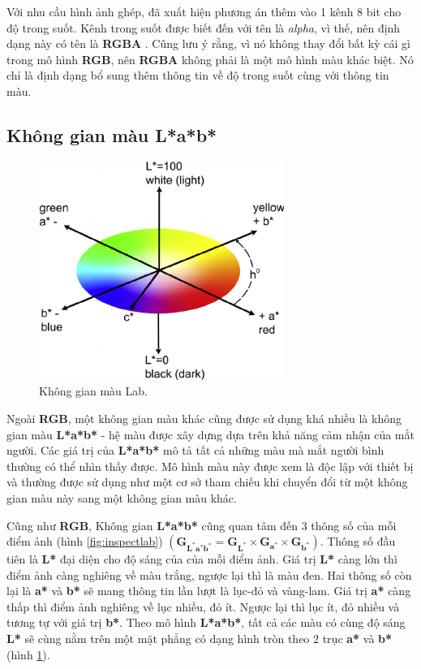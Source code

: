 \documentclass[a4paper, 12pt]{report}
\begin{document}
Với nhu cầu hình ảnh ghép, đã xuất hiện phương án thêm vào 1 kênh 8 bit cho độ trong suốt.
Kênh trong suốt được biết đến với tên là \textit{alpha}, vì thế, nên định dạng này có tên là \textbf{RGBA} \cite{wikirgba2021}. Cũng lưu ý rằng, vì nó không thay đổi bất kỳ cái gì trong mô hình \textbf{RGB}, nên \textbf{RGBA} không phải là một mô hình màu khác biệt.
Nó chỉ là định dạng bổ sung thêm thông tin về độ trong suốt cùng với thông tin màu.

\subsection{Không gian màu L*a*b*}\label{introtolabspace}

\begin{figure}
\includegraphics[width=8cm]{images/2_2.png} 
\caption{Không gian màu Lab.}
\label{fig:labspace}
\end{figure}

Ngoài \textbf{RGB}, một không gian màu khác cũng được sử dụng khá nhiều là không gian màu \textbf{L*a*b*} \cite{wikilab2021} - hệ màu được xây dựng dựa trên khả năng cảm nhận của mắt người.
Các giá trị của \textbf{L*a*b*} mô tả tất cả những màu mà mắt người bình thường có thể nhìn thấy được.
Mô hình màu này được xem là độc lập với thiết bị và thường được sử dụng như một cơ sở tham chiếu khi chuyển đổi từ một không gian màu này sang một không gian màu khác.\vspace{5pt}

Cũng như \textbf{RGB}, Không gian \textbf{L*a*b*} cũng quan tâm đến 3 thông số của mỗi điểm ảnh (hình \ref{fig:inspectlab}) $\left(\bm{G}_{\mathbf{L^*}\mathbf{a^*}\mathbf{b^*}} = \bm{G}_{\mathbf{L}^*} \times \bm{G}_{\mathbf{a}^*} \times \bm{G}_{\mathbf{b}^*}\right)$.
Thông số đầu tiên là \textbf{L*} đại diện cho độ sáng của của mỗi điểm ảnh.
Giá trị \textbf{L*} càng lớn thì điểm ảnh càng nghiêng về màu trắng, ngược lại thì là màu đen.
Hai thông số còn lại là \textbf{a*} và \textbf{b*} sẽ mang thông tin lần lượt là lục-đỏ và vàng-lam.
Giá trị \textbf{a*} càng thấp thì điểm ảnh nghiêng về lục nhiều, đỏ ít.
Ngược lại thì lục ít, đỏ nhiều và tương tự với giá trị \textbf{b*}.
Theo mô hình \textbf{L*a*b*}, tất cả các màu có cùng độ sáng \textbf{L*} sẽ cùng nằm trên một mặt phẳng có dạng hình tròn theo 2 trục \textbf{a*} và \textbf{b*} (hình \ref{fig:labspace}).\vspace{5pt}
\end{document}
